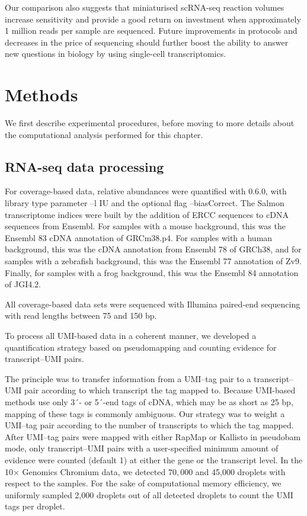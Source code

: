 Our comparison also suggests that miniaturised scRNA-seq reaction volumes increase sensitivity and provide a good return on investment when approximately 1 million reads per sample are sequenced. Future improvements in protocols and decreases in the price of sequencing should further boost the ability to answer new questions in biology by using single-cell transcriptomics.

\section{Methods}

We first describe experimental procedures, before moving to more details about the computational analysis performed for this chapter.

\subsection{RNA-seq data processing}

For coverage-based data, relative abundances were quantified with  \cite{Patro2017-wf} 0.6.0, with library type parameter --l IU and the optional flag --biasCorrect. The Salmon transcriptome indices were built by the addition of ERCC sequences to cDNA sequences from Ensembl. For samples with a mouse background, this was the Ensembl 83 cDNA annotation of GRCm38.p4. For samples with a human background, this was the cDNA annotation from Ensembl 78 of GRCh38, and for samples with a zebrafish background, this was the Ensembl 77 annotation of Zv9. Finally, for samples with a frog background, this was the Ensembl 84 annotation of JGI4.2.

All coverage-based data sets were sequenced with Illumina paired-end sequencing with read lengths between 75 and 150 bp.

To process all UMI-based data in a coherent manner, we developed a quantification strategy based on pseudomapping and counting evidence for transcript–UMI pairs.

The principle was to transfer information from a UMI–tag pair to a transcript–UMI pair according to which transcript the tag mapped to. Because UMI-based methods use only 3´- or 5´-end tags of cDNA, which may be as short as 25 bp, mapping of these tags is commonly ambiguous. Our strategy was to weight a UMI–tag pair according to the number of transcripts to which the tag mapped. After UMI–tag pairs were mapped with either RapMap \cite{Srivastava2016-nx} or Kallisto \cite{Bray2016-dh} in pseudobam mode, only transcript–UMI pairs with a user-specified minimum amount of evidence were counted (default 1) at either the gene or the transcript level. In the 10× Genomics Chromium data, we detected \( 70,000 \) and 45,000 droplets with respect to the samples. For the sake of computational memory efficiency, we uniformly sampled 2,000 droplets out of all detected droplets to count the UMI tags per droplet.

